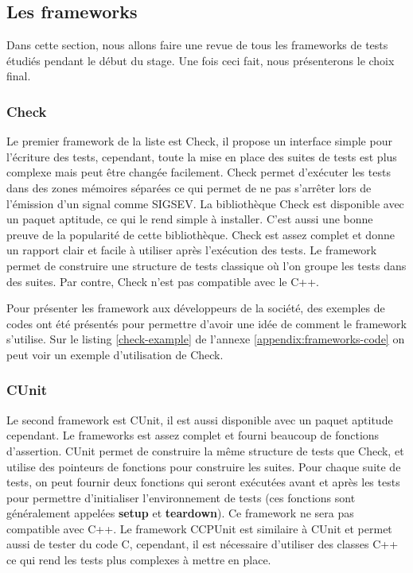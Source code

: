 \documentclass[a4paper]{article}
\begin{document}
\subsection{Les frameworks}%

Dans cette section, nous allons faire une revue de tous les frameworks de tests
étudiés pendant le début du stage. Une fois ceci fait, nous présenterons le
choix final.

\subsubsection*{Check}

Le premier framework de la liste est Check, il propose un interface simple pour
l'écriture des tests, cependant, toute la mise en place des suites de tests est
plus complexe mais peut être changée facilement. Check permet d'exécuter les
tests dans des zones mémoires séparées ce qui permet de ne pas s'arrêter lors de
l'émission d'un signal comme SIGSEV. La bibliothèque Check est disponible avec
un paquet aptitude, ce qui le rend simple à installer. C'est aussi une bonne
preuve de la popularité de cette bibliothèque. Check est assez complet et donne
un rapport clair et facile à utiliser après l'exécution des tests. Le framework
permet de construire une structure de tests classique où l'on groupe les tests
dans des suites. Par contre, Check n'est pas compatible avec le C++.

Pour présenter les framework aux développeurs de la société, des exemples de
codes ont été présentés pour permettre d'avoir une idée de comment le framework
s'utilise. Sur le listing \ref{check-example} de l'annexe
\ref{appendix:frameworks-code} on peut voir un exemple d'utilisation de Check.

\subsubsection*{CUnit}

Le second framework est CUnit, il est aussi disponible avec un paquet aptitude
cependant. Le frameworks est assez complet et fourni beaucoup de fonctions
d'assertion. CUnit permet de construire la même structure de tests que Check, et
utilise des pointeurs de fonctions pour construire les suites. Pour chaque suite
de tests, on peut fournir deux fonctions qui seront exécutées avant et après les
tests pour permettre d'initialiser l'environnement de tests (ces fonctions sont
généralement appelées \textbf{setup} et \textbf{teardown}). Ce framework ne sera
pas compatible avec C++. Le framework CCPUnit est similaire à CUnit et permet
aussi de tester du code C, cependant, il est nécessaire d'utiliser des classes
C++ ce qui rend les tests plus complexes à mettre en place.
\end{document}
